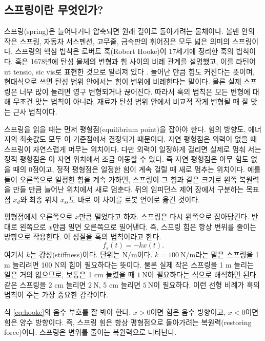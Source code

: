 \subsection{스프링이란 무엇인가?}

스프링(spring)은 늘어나거나 압축되면 원래 길이로 돌아가려는 물체이다.
볼펜 안의 작은 스프링, 자동차 서스펜션, 고무줄, 금속판의 휘어짐은 모두 넓은 의미의 스프링이다.
스프링의 핵심 법칙은 로버트 훅(Robert Hooke)이 17세기에 정리한 훅의 법칙이다.
훅은 1678년에 탄성 물체의 변형과 힘 사이의 비례 관계를 설명했고, 이를 라틴어 ut tensio, sic vis로 표현한 것으로 알려져 있다 \cite{hooke1678depotentiarestitutiva}.
늘어난 만큼 힘도 커진다는 뜻이며, 현대식으로 쓰면 탄성 범위 안에서는 힘이 변위에 비례한다는 말이다.
물론 실제 스프링은 너무 많이 늘리면 영구 변형되거나 끊어진다.
따라서 훅의 법칙은 모든 변형에 대해 무조건 맞는 법칙이 아니라, 재료가 탄성 범위 안에서 비교적 작게 변형될 때 잘 맞는 근사 법칙이다.

스프링을 읽을 때는 먼저 평형점(equilibrium point)을 잡아야 한다.
힘의 방향도, 에너지의 최솟값도 모두 이 기준점에서 결정되기 때문이다.
자연 평형점은 외력이 없을 때 스프링이 자연스럽게 머무는 위치이다.
다만 외력이 일정하게 걸리면 실제로 멈춰 서는 정적 평형점은 이 자연 위치에서 조금 이동할 수 있다.
즉 자연 평형점은 아무 힘도 없을 때의 0점이고, 정적 평형점은 일정한 힘이 계속 걸릴 때 새로 멈추는 위치이다.
예를 들어 오른쪽으로 일정한 힘을 계속 가하면, 스프링이 그 힘과 같은 크기로 왼쪽 복원력을 만들 만큼 늘어난 위치에서 새로 멈춘다.
뒤의 임피던스 제어 장에서 구분하는 목표점 $x_d$와 최종 위치 $x_{\mathrm{ss}}$도 바로 이 차이를 로봇 언어로 옮긴 것이다.

평형점에서 오른쪽으로 $x$만큼 밀었다고 하자.
스프링은 다시 왼쪽으로 잡아당긴다.
반대로 왼쪽으로 $x$만큼 밀면 오른쪽으로 밀어낸다.
즉, 스프링 힘은 항상 변위를 줄이는 방향으로 작용한다.
이 성질을 훅의 법칙이라고 한다.
\begin{equation}
  f_s(t)=-kx(t).
  \label{eq:hooke}
\end{equation}
여기서 $k$는 강성(stiffness)이다.
단위는 N/m이다.
$k=100~\mathrm{N/m}$라는 말은 스프링을 1 m 늘리려면 100 N의 힘이 필요하다는 뜻이다.
물론 실제 작은 스프링을 1 m 늘리는 일은 거의 없으므로, 보통은 1 cm 늘렸을 때 $1~\mathrm{N}$이 필요하다는 식으로 해석하면 된다.
같은 스프링을 2 cm 늘리면 $2~\mathrm{N}$, 5 cm 늘리면 $5~\mathrm{N}$이 필요하다.
이런 선형 비례가 훅의 법칙이 주는 가장 중요한 감각이다.

식 \eqref{eq:hooke}의 음수 부호를 잘 봐야 한다.
$x>0$이면 힘은 음수 방향이고, $x<0$이면 힘은 양수 방향이다.
즉, 스프링 힘은 항상 평형점으로 돌아가려는 복원력(restoring force)이다.
스프링은 변위를 줄이는 복원력으로 나타난다.

